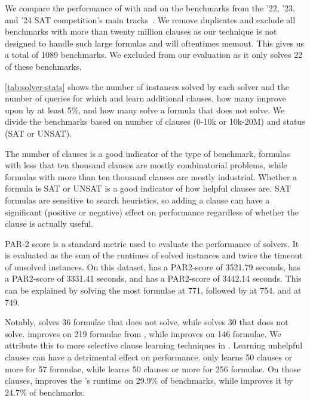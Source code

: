 We compare the performance of \tool with \cadical and \prelearn on the
benchmarks from the '22, '23, and '24 SAT competition's main
tracks~\cite{satcomp2022,satcomp2023,satcomp2024}. We remove duplicates and
exclude all benchmarks with more than twenty million clauses as our technique
is not designed to handle such large formulas and will oftentimes memout. This gives us a
total of 1089 benchmarks. We excluded \sadical from our evaluation as it 
only solves 22 of these benchmarks.

\autoref{tab:solver-stats} shows the number of instances solved by each solver
and the number of queries for which \prelearn and \cadical learn additional \pr
clauses, how many improve upon \cadical by at least 5\%, and how many solve a
formula that \cadical does not solve. We divide the benchmarks based on number
of clauses (0-10k or 10k-20M) and status (SAT or UNSAT). 

The number of clauses 
is a good indicator of the type of benchmark, formulas with less that ten thousand
clauses are mostly combinatorial problems, while formulas with more than ten thousand
clauses are mostly industrial. Whether a formula is SAT or UNSAT is a good indicator 
of how helpful \pr clauses are. SAT formulas are sensitive to search heuristics, so 
adding a \pr clause can have a significant (positive or negative) effect on performance
regardless of whether the clause is actually useful.

PAR-2 score is a standard metric used to evaluate the performance of solvers. It
is evaluated as the sum of the runtimes of solved instances and twice the
timeout of unsolved instances. On this dataset, \cadical has a PAR2-score of
3521.79 seconds, \prelearn has a PAR2-score of 3331.41 seconds, and \tool has a
PAR2-score of 3442.14 seconds. This can be explained by \prelearn solving the
most formulae at 771, followed by \tool at 754, and \cadical at 749.

Notably, \tool solves 36 formulae that \cadical does not solve, while \prelearn
solves 30 that \cadical does not solve. \tool improves on 219 formulae from
\cadical, while \prelearn improves on 146 formulae. We attribute this to more
selective \pr clause learning techniques in \tool. Learning unhelpful \pr
clauses can have a detrimental effect on performance. \tool only learns 50 \pr
clauses or more for 57 formulae, while \prelearn learns 50 \pr clauses or more
for 256 formulae. On those clauses, \tool improves the \cadical's runtime on
29.9\% of benchmarks, while \prelearn improves it by 24.7\% of benchmarks.

